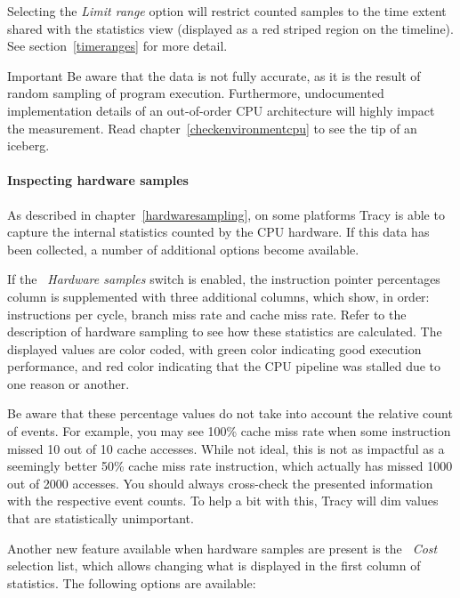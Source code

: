 \documentclass[hidelinks,titlepage,a4paper]{article}
\begin{document}
Selecting the \emph{Limit range} option will restrict counted samples to the time extent shared with the statistics view (displayed as a red striped region on the timeline). See section~\ref{timeranges} for more detail.

\begin{bclogo}[
noborder=true,
couleur=black!5,
logo=\bcbombe
]{Important}
Be aware that the data is not fully accurate, as it is the result of random sampling of program execution. Furthermore, undocumented implementation details of an out-of-order CPU architecture will highly impact the measurement. Read chapter~\ref{checkenvironmentcpu} to see the tip of an iceberg.
\end{bclogo}

\paragraph{Inspecting hardware samples}

As described in chapter~\ref{hardwaresampling}, on some platforms Tracy is able to capture the internal statistics counted by the CPU hardware. If this data has been collected, a number of additional options become available.

If the \emph{\faHammer{}~Hardware samples} switch is enabled, the instruction pointer percentages column is supplemented with three additional columns, which show, in order: instructions per cycle, branch miss rate and cache miss rate. Refer to the description of hardware sampling to see how these statistics are calculated. The displayed values are color coded, with green color indicating good execution performance, and red color indicating that the CPU pipeline was stalled due to one reason or another.

Be aware that these percentage values do not take into account the relative count of events. For example, you may see 100\% cache miss rate when some instruction missed 10 out of 10 cache accesses. While not ideal, this is not as impactful as a seemingly better 50\% cache miss rate instruction, which actually has missed 1000 out of 2000 accesses. You should always cross-check the presented information with the respective event counts. To help a bit with this, Tracy will dim values that are statistically unimportant.

Another new feature available when hardware samples are present is the \emph{\faHighlighter{}~Cost} selection list, which allows changing what is displayed in the first column of statistics. The following options are available:
\end{document}
